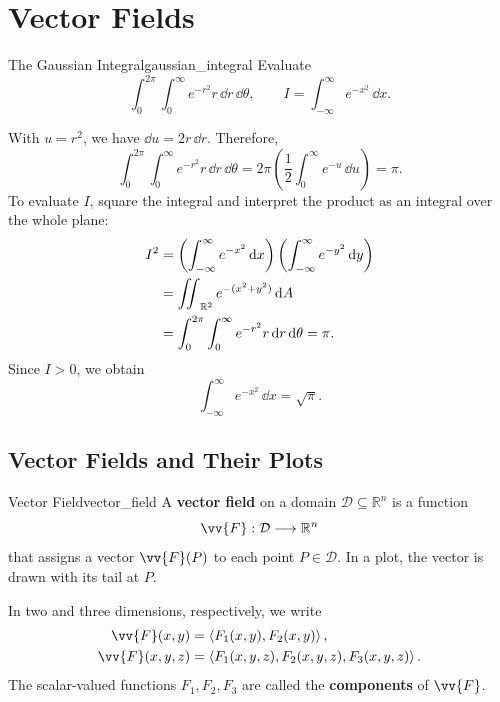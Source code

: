 \section{Vector Fields}

\begin{problem}{The Gaussian Integral}{gaussian_integral}
Evaluate
\[
    \int_0^{2\pi}\int_0^\infty e^{-r^2}r\,\dd{r}\,\dd{\theta},
    \qquad I = \int_{-\infty}^\infty e^{-x^2}\,\dd{x}.
\]
\end{problem}

\begin{sol}
With $u = r^2$, we have $\dd{u} = 2r\,\dd{r}$. Therefore,
\[
    \int_0^{2\pi}\int_0^\infty e^{-r^2}r\,\dd{r}\,\dd{\theta}
    = 2\pi\left(\frac{1}{2}\int_0^\infty e^{-u}\,\dd{u}\right)
    = \pi.
\]
To evaluate $I$, square the integral and interpret the product as an integral over the whole plane:
\begin{align*}
    I^2
    &= \left(\int_{-\infty}^\infty e^{-x^2}\,\mathrm{d}x\right)
       \left(\int_{-\infty}^\infty e^{-y^2}\,\mathrm{d}y\right)\\
    &= \mathop{\int\mkern-10mu\int}\nolimits_{\mathbb{R}^2} e^{-(x^2 + y^2)} \, \mathrm{d}A\\
    &= \int_0^{2\pi}\int_0^\infty e^{-r^2}r\,\mathrm{d}r\,\mathrm{d}\theta
    = \pi.
\end{align*}
Since $I > 0$, we obtain
\[
    \boxed{\int_{-\infty}^\infty e^{-x^2}\,\dd{x} = \sqrt{\pi}.}
\]
\end{sol}

\newpage
\subsection{Vector Fields and Their Plots}

\begin{definition}{Vector Field}{vector_field}
A \textbf{vector field} on a domain $\mathcal{D} \subseteq \mathbb{R}^n$ is a function
\[
    \vv{F}:\mathcal{D} \longrightarrow \mathbb{R}^n
\]
that assigns a vector $\vv{F}(P)$ to each point $P \in \mathcal{D}$. In a plot, the vector is drawn with its tail at $P$.

In two and three dimensions, respectively, we write
\begin{align*}
    \vv{F}(x,y) &= \ang{F_1(x,y),F_2(x,y)},\\
    \vv{F}(x,y,z) &= \ang{F_1(x,y,z),F_2(x,y,z),F_3(x,y,z)}.
\end{align*}
The scalar-valued functions $F_1,F_2,F_3$ are called the \textbf{components} of $\vv{F}$.
\end{definition}

